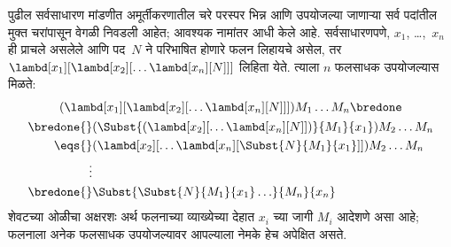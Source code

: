 \documentclass[../../../include/open-logic-section]{subfiles}
\begin{document}
पुढील सर्वसाधारण मांडणीत अमूर्तीकरणातील चरे परस्पर भिन्न
आणि उपयोजल्या जाणाऱ्या सर्व पदांतील मुक्त चरांपासून वेगळी
निवडली आहेत; आवश्यक नामांतर आधी केले आहे.
सर्वसाधारणपणे, $x_1$, \dots,~$x_n$ ही प्राचले असलेले
आणि पद~$N$ ने परिभाषित होणारे फलन लिहायचे असेल,
तर $\lambd[x_1][\lambd[x_2][\ldots\lambd[x_n][N]]]$
लिहिता येते. त्याला $n$ फलसाधक उपयोजल्यास मिळते:
\begin{multline*}
  (\lambd[x_1][\lambd[x_2][\ldots\lambd[x_n][N]]]) M_1 \dots M_n \bredone\\
  \begin{aligned}
  \bredone {} & (\Subst{(\lambd[x_2][\ldots\lambd[x_n][N]])}{M_1}{x_1}) M_2
  \dots M_n\\
   \eqs {} & (\lambd[x_2][\ldots\lambd[x_n][\Subst{N}{M_1}{x_1}]]) M_2
            \dots M_n \\
  \vdots & \\
  \bredone {} &\Subst{\Subst{N}{M_1}{x_1}\ldots}{M_n}{x_n}
  \end{aligned}
\end{multline*}
शेवटच्या ओळीचा अक्षरशः अर्थ फलनाच्या व्याख्येच्या देहात
$x_i$ च्या जागी $M_i$ आदेशणे असा आहे; फलनाला अनेक
फलसाधक उपयोजल्यावर आपल्याला नेमके हेच अपेक्षित असते.
\end{document}
